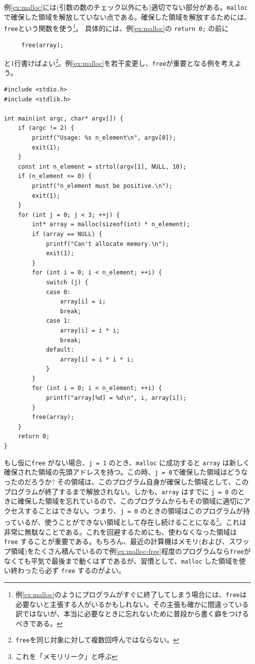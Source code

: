 例\ref{ex:malloc}には(引数の数のチェック以外にも)適切でない部分がある。\texttt{malloc}で確保した領域を解放していない点である。確保した領域を解放するためには、\texttt{free}という関数を使う\footnote{例\ref{ex:malloc}のようにプログラムがすぐに終了してしまう場合には、\texttt{free}は必要ないと主張する人がいるかもしれない。その主張も確かに間違っている訳ではないが、本当に必要なときに忘れないために普段から書く癖をつけるべきである。}。
具体的には、例\ref{ex:malloc}の \texttt{return 0;} の前に
\begin{verbatim}
     free(array);
\end{verbatim}
と1行書けばよい\footnote{\texttt{free}を同じ対象に対して複数回呼んではならない。}。例\ref{ex:malloc}を若干変更し、\texttt{free}が重要となる例を考えよう。
\begin{reidai}\label{ex:malloc-free}
    \begin{verbatim}
#include <stdio.h>
#include <stdlib.h>

int main(int argc, char* argv[]) {
    if (argc != 2) {
        printf("Usage: %s n_element\n", argv[0]);
        exit(1);
    }
    const int n_element = strtol(argv[1], NULL, 10);
    if (n_element <= 0) {
        printf("n_element must be positive.\n");
        exit(1);
    }
    for (int j = 0; j < 3; ++j) {
        int* array = malloc(sizeof(int) * n_element);
        if (array == NULL) {
            printf("Can't allocate memory.\n");
            exit(1);
        }
        for (int i = 0; i < n_element; ++i) {
            switch (j) {
            case 0:
                array[i] = i;
                break;
            case 1:
                array[i] = i * i;
                break;
            default:
                array[i] = i * i * i;
            }
        }
        for (int i = 0; i < n_element; ++i) {
            printf("array[%d] = %d\n", i, array[i]);
        }
        free(array);
    }
    return 0;
}
\end{verbatim}
\end{reidai} \noindent
もし仮に\texttt{free} がない場合、\texttt{j = 1} のとき、\texttt{malloc} に成功すると \texttt{array} は新しく確保された領域の先頭アドレスを持つ。この時、\texttt{j = 0}で確保した領域はどうなったのだろうか? その領域は、このプログラム自身が確保した領域として、このプログラムが終了するまで解放されない。しかも、\texttt{array} はすでに \texttt{j = 0} のときに確保した領域を忘れているので、このプログラムからもその領域に適切にアクセスすることはできない。つまり、\texttt{j = 0} のときの領域はこのプログラムが持っているが、使うことができない領域として存在し続けることになる\footnote{これを「メモリリーク」と呼ぶ}。これは非常に無駄なことである。これを回避するためにも、使わなくなった領域は \texttt{free} することが重要である。もちろん、最近の計算機はメモリ(および、スワップ領域)をたくさん積んでいるので例\ref{ex:malloc-free}程度のプログラムなら\texttt{free}がなくても平気で最後まで動くはずであるが、習慣として、\texttt{malloc} した領域を使い終わったら必ず \texttt{free} するのがよい。

